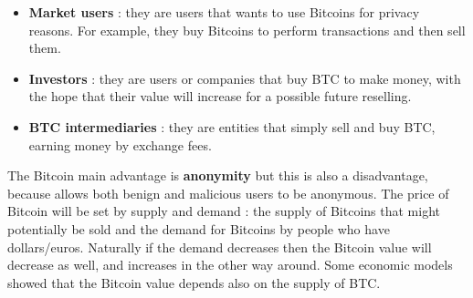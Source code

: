 \begin{itemize}
\item \textbf{Market users} : they are users that wants to use Bitcoins for privacy reasons. For example, they buy Bitcoins to perform transactions and then sell them.
\item \textbf{Investors} : they are users or companies that buy BTC to make money, with the hope that their value will increase for a possible future reselling.
\item \textbf{BTC intermediaries} : they are entities that simply sell and buy BTC, earning money by exchange fees.
\end{itemize}
The Bitcoin main advantage is \textbf{anonymity} but this is also a disadvantage, because allows both benign and malicious users to be anonymous. The price of Bitcoin will be set by supply and demand : the supply of Bitcoins that might potentially be sold and the demand for Bitcoins by people who have dollars/euros. Naturally if the demand decreases then the Bitcoin value will decrease as well, and increases in the other way around. Some economic models showed that the Bitcoin value depends also on the supply of BTC.

